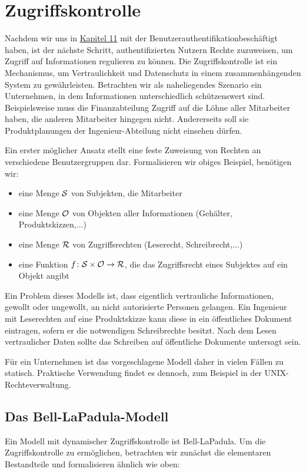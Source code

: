 \chapter{Zugriffskontrolle}
Nachdem wir uns in \hyperref[cha11]{Kapitel 11} mit der
Benutzerauthentifikation\indexAccessControl beschäftigt haben, ist der
nächste Schritt, authentifizierten Nutzern Rechte zuzuweisen, um Zugriff
auf Informationen regulieren zu können. Die Zugriffskontrolle ist ein
Mechanismus, um Vertraulichkeit und Datenschutz in einem
zusammenhängenden System zu gewährleisten.  Betrachten wir als
naheliegendes Szenario ein Unternehmen, in dem Informationen
unterschiedlich schützenswert sind. Beispielsweise muss die
Finanzabteilung Zugriff auf die Löhne aller Mitarbeiter haben, die
anderen Mitarbeiter hingegen nicht. Andererseits soll sie
Produktplanungen der Ingenieur-Abteilung nicht einsehen dürfen.

Ein erster möglicher Ansatz stellt eine feste Zuweisung von Rechten an
verschiedene Benutzergruppen dar.  Formalisieren wir obiges Beispiel,
benötigen wir:

\begin{itemize}
\item eine Menge $\mathcal{S}$ von Subjekten, die Mitarbeiter
\item eine Menge $\mathcal{O}$ von Objekten aller Informationen (Gehälter, Produktskizzen,...)
\item eine Menge $\mathcal{R}$  von Zugriffsrechten (Leserecht, Schreibrecht,...)
\item eine Funktion $f\colon \mathcal{S} \times \mathcal{O} \rightarrow \mathcal{R}$, die das Zugriffsrecht eines Subjektes auf ein Objekt angibt
\end{itemize}

Ein Problem dieses Modells ist, dass eigentlich vertrauliche
Informationen, gewollt oder ungewollt, an nicht autorisierte Personen
gelangen. Ein Ingenieur mit Leserechten auf eine Produktskizze kann
diese in ein öffentliches Dokument eintragen, sofern er die notwendigen
Schreibrechte besitzt. Nach dem Lesen vertraulicher Daten sollte das
Schreiben auf öffentliche Dokumente untersagt sein.

Für ein Unternehmen ist das vorgeschlagene Modell daher in vielen Fällen
zu statisch. Praktische Verwendung findet es dennoch, zum Beispiel in
der UNIX-Rechteverwaltung.

\section{Das Bell-LaPadula-Modell}\indexBellLaPadula
Ein Modell mit dynamischer Zugriffskontrolle ist Bell-LaPadula. Um die
Zugriffskontrolle zu ermöglichen, betrachten wir zunächst die
elementaren Bestandteile und formalisieren ähnlich wie oben: 

